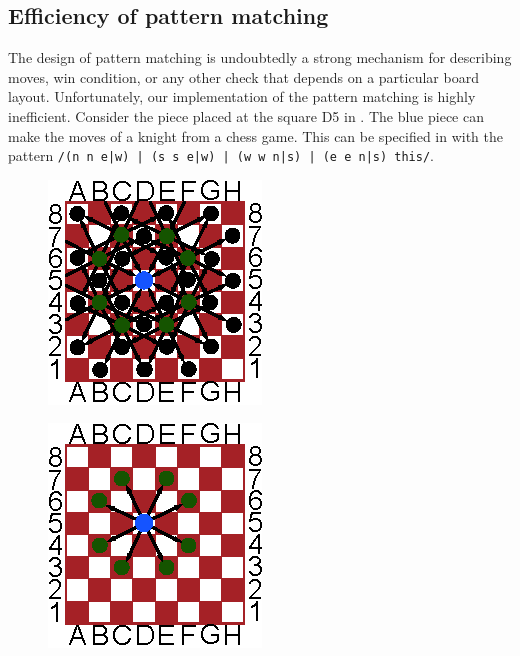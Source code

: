 \subsection{Efficiency of pattern matching}
\label{sec:patternmatchingefficiency}
The design of pattern matching is undoubtedly a strong mechanism for
describing moves, win condition, or any other check that depends on
a particular board layout. Unfortunately, our implementation of the
pattern matching is highly inefficient. Consider the piece placed at
the square D5 in . The blue piece can
make the moves of a knight from a chess game. This can be specified in
\productname{} with the pattern \texttt{/(n n e|w) | (s s e|w) | (w w
n|s) | (e e n|s) this/}.

\begin{figure}
\centering
\begin{minipage}{.5\textwidth}
  \centering
  \includegraphics[width=.4\linewidth]{pictures/inefficientpatterns}
  \label{fig:inefficientpatterns}
\end{minipage}%
\begin{minipage}{.5\textwidth}
  \centering
  \includegraphics[width=.4\linewidth]{pictures/efficientpatterns}
  \label{fig:efficientpatterns}
\end{minipage}
\end{figure}

